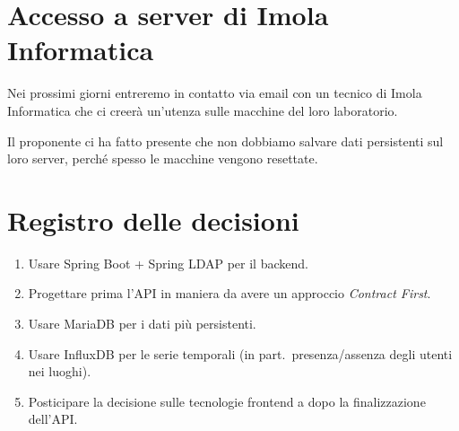 \documentclass{article}
\begin{document}


\section{Accesso a server di Imola Informatica}%
\label{sec:accesso_a_server_di_imola_informatica}

Nei prossimi giorni entreremo in contatto via email con un tecnico di Imola Informatica che ci creerà un'utenza sulle macchine del loro laboratorio.

Il proponente ci ha fatto presente che non dobbiamo salvare dati persistenti sul loro server, perché spesso le macchine vengono resettate.


\newpage
\section{Registro delle decisioni}%
\label{sec:registro_delle_decisioni}

\begin{enumerate}
  \item Usare Spring Boot + Spring LDAP per il backend.
  \item Progettare prima l'API in maniera da avere un approccio \textit{Contract First}.
  \item Usare MariaDB per i dati più persistenti.
  \item Usare InfluxDB per le serie temporali (in part.\ presenza/assenza degli utenti nei luoghi).
  \item Posticipare la decisione sulle tecnologie frontend a dopo la finalizzazione dell'API\@.
\end{enumerate}
\end{document}
